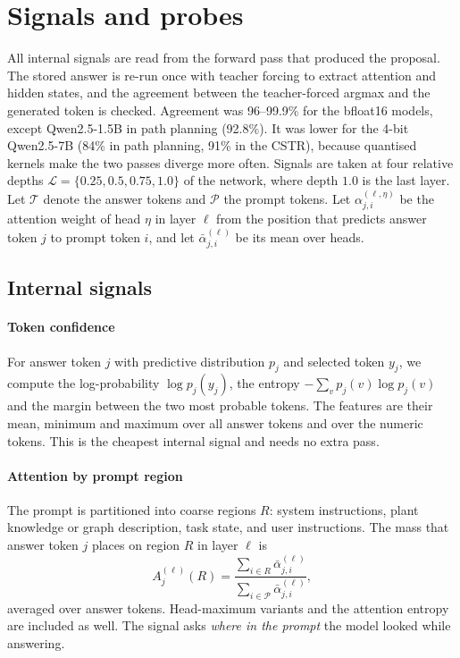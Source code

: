 \section{Signals and probes}\label{sec:signals}

All internal signals are read from the forward pass that produced the proposal. The stored answer is re-run once
with teacher forcing to extract attention and hidden states, and the agreement between the teacher-forced
argmax and the generated token is checked. Agreement was 96--99.9\% for the bfloat16 models, except
Qwen2.5-1.5B in path planning (92.8\%). It was lower for the 4-bit Qwen2.5-7B (84\% in path planning, 91\% in the
CSTR), because quantised kernels make the two passes diverge more often. Signals are taken at four
relative depths $\mathcal L=\{0.25,0.5,0.75,1.0\}$ of the network, where depth $1.0$ is the last layer. Let
$\mathcal T$ denote the answer tokens and $\mathcal P$ the prompt tokens. Let $\alpha^{(\ell,\eta)}_{j,i}$ be the
attention weight of head $\eta$ in layer $\ell$ from the position that predicts answer token $j$ to prompt token
$i$, and let $\bar\alpha^{(\ell)}_{j,i}$ be its mean over heads.

\subsection{Internal signals}

\paragraph{Token confidence} For answer token $j$ with predictive distribution $p_j$ and selected token $y_j$,
we compute the log-probability $\log p_j(y_j)$, the entropy $-\sum_v p_j(v)\log p_j(v)$ and the margin between
the two most probable tokens. The features are their mean, minimum and maximum over all answer tokens and over
the numeric tokens. This is the cheapest internal signal and needs no extra pass.

\paragraph{Attention by prompt region} The prompt is partitioned into coarse regions $R$: system instructions,
plant knowledge or graph description, task state, and user instructions. The mass that answer token $j$ places on
region $R$ in layer $\ell$ is
\begin{equation}\label{eq:regionmass}
A^{(\ell)}_j(R)=\frac{\sum_{i\in R}\bar\alpha^{(\ell)}_{j,i}}{\sum_{i\in\mathcal P}\bar\alpha^{(\ell)}_{j,i}},
\end{equation}
averaged over answer tokens. Head-maximum variants and the attention entropy are included as well. The signal
asks \emph{where in the prompt} the model looked while answering.

